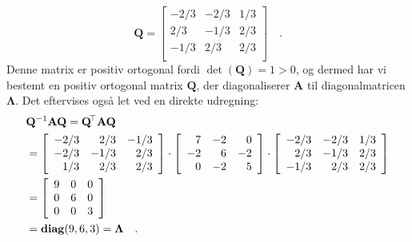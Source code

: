 \begin{example}
\begin{equation}
\mathbf{Q}= \left[
          \begin{array}{rrr}
            -2/3 & -2/3 & 1/3 \\
            2/3 & -1/3 & 2/3 \\
            -1/3 & 2/3 & 2/3 \\
          \end{array}
        \right] \quad .
\end{equation}
Denne matrix er positiv ortogonal fordi $\det(\mathbf{Q}) = 1 > 0$, og dermed har vi bestemt en positiv ortogonal matrix $\mathbf{Q}$, der diagonaliserer $\mathbf{A}$ til diagonalmatricen $\bm{\Lambda}$. Det eftervises også let ved en direkte udregning:
\begin{equation}
\begin{aligned}
&\mathbf{Q}^{-1} \mathbf{A} \mathbf{Q} = \mathbf{Q}\hspace*{-.6mm}^{\top} \mathbf{A} \mathbf{Q}\\  &= \left[
          \begin{array}{rrr}
            -2/3 & 2/3 & -1/3 \\
            -2/3 & -1/3 & 2/3 \\
            1/3 & 2/3 & 2/3 \\
          \end{array}
        \right] \cdot \left[
               \begin{array}{rrr}
                  7 & -2 & 0 \\
                 -2 & 6 & -2 \\
                 0 & -2 & 5 \\
               \end{array}
             \right] \cdot \left[
          \begin{array}{rrr}
            -2/3 & -2/3 & 1/3 \\
            2/3 & -1/3 & 2/3 \\
            -1/3 & 2/3 & 2/3 \\
          \end{array}
        \right] \\ &=
                                                          \left[
                                                                      \begin{array}{rrr}
                                                                        9 & 0 & 0 \\
                                                                        0 & 6 & 0 \\
                                                                        0 & 0 & 3 \\
                                                                      \end{array}
                                                                    \right] \\
&= \operatorname{\bf{diag}}(9,6,3) = \bm{\Lambda} \quad .
\end{aligned}
\end{equation}
\end{example}

